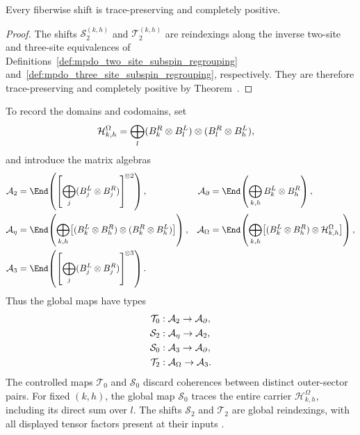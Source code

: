 \begin{lemma}
    \label{thm:mpdo_fiberwise_shifts_cptp}
    \leanok
    Every fiberwise shift is trace-preserving and completely positive.
\end{lemma}
\begin{proof}
    \leanok

    The shifts $\mathcal S_2^{(k,h)}$ and $\mathcal T_2^{(k,h)}$ are
    reindexings along the inverse two-site and three-site equivalences of
    Definitions~\ref{def:mpdo_two_site_subspin_regrouping}
    and~\ref{def:mpdo_three_site_subspin_regrouping}, respectively. They are
    therefore trace-preserving and completely positive by
    Theorem~\cite[``Equivalence reindexing is trace-preserving completely positive'']{QICLean2026Blueprint}.
\end{proof}

To record the domains and codomains, set
\begin{align}
    \mathcal H^{\Omega}_{k,h}
     & =\bigoplus_l
    (B_k^R\otimes B_l^L)\otimes(B_l^R\otimes B_h^L), \notag
\end{align}
and introduce the matrix algebras
\begin{align}
    \mathcal A_2
     & =\End\!\left(\left[\bigoplus_j(B_j^L\otimes B_j^R)\right]^{\!\otimes2}\right),
     &
    \mathcal A_{\partial}
     & =\End\!\left(\bigoplus_{k,h}B_k^L\otimes B_h^R\right), \notag                  \\
    \mathcal A_{\eta}
     & =\End\!\left(\bigoplus_{k,h}\bigl[(B_k^L\otimes B_h^R)\otimes
            (B_k^R\otimes B_h^L)\bigr]\right),
     &
    \mathcal A_{\Omega}
     & =\End\!\left(\bigoplus_{k,h}\bigl[(B_k^L\otimes B_h^R)\otimes
    \mathcal H^{\Omega}_{k,h}\bigr]\right), \notag                                    \\
    \mathcal A_3
     & =\End\!\left(\left[\bigoplus_j(B_j^L\otimes B_j^R)\right]^{\!\otimes3}\right).
    \notag
\end{align}
Thus the global maps have types
\begin{align}
    \mathcal T_0 & :\mathcal A_2\to\mathcal A_{\partial}, \notag \\
    \mathcal S_2 & :\mathcal A_{\eta}\to\mathcal A_2, \notag     \\
    \mathcal S_0 & :\mathcal A_3\to\mathcal A_{\partial}, \notag \\
    \mathcal T_2 & :\mathcal A_{\Omega}\to\mathcal A_3. \notag
\end{align}
The controlled maps $\mathcal T_0$ and $\mathcal S_0$ discard coherences
between distinct outer-sector pairs. For fixed $(k,h)$, the global map
$\mathcal S_0$ traces the entire carrier $\mathcal H^{\Omega}_{k,h}$, including
its direct sum over $l$. The shifts $\mathcal S_2$ and $\mathcal T_2$ are
global reindexings, with all displayed tensor factors present at their inputs
\cite[Appendix~C.2, lines~1521--1559]{Cirac2016MPDO_arXiv}.

